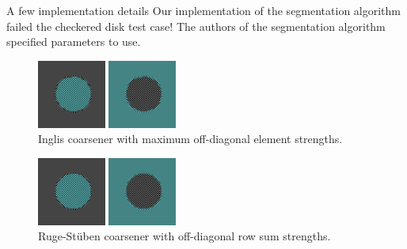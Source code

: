 \documentclass[8pt]{beamer}
\begin{document}
\begin{frame}{A few implementation details}
   Our implementation of the segmentation algorithm failed the checkered disk test case!  The authors of the segmentation algorithm specified parameters to use.

   \begin{figure}[ht]
      \centering
      \includegraphics[width=0.2\textwidth]{checker_disk_60_seg_blend_segAMG_max_el_0000.png} \hspace{0.45cm}
      \includegraphics[width=0.2\textwidth]{checker_disk_60_seg_blend_segAMG_max_el_0001.png}
      ~\\Inglis coarsener with maximum off-diagonal element strengths.
   \end{figure}

   \begin{figure}[ht]
      \centering
      \includegraphics[width=0.2\textwidth]{checker_disk_60_seg_blend_RSAMG_row_sum_0000.png} \hspace{0.45cm}
      \includegraphics[width=0.2\textwidth]{checker_disk_60_seg_blend_RSAMG_row_sum_0001.png} 
      ~\\Ruge-St\"uben coarsener with off-diagonal row sum strengths.
   \end{figure}

\end{frame}
\end{document}
